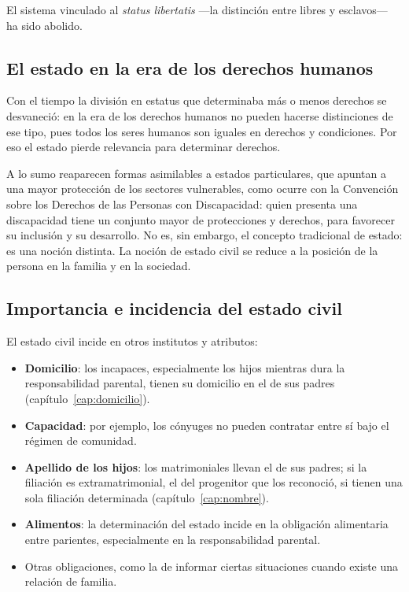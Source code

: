 \documentclass[12pt,oneside]{book}
\begin{document}
El sistema vinculado al \textit{status libertatis} ---la distinción entre libres y esclavos--- ha sido abolido.

\subsection{El estado en la era de los derechos humanos}

Con el tiempo la división en estatus que determinaba más o menos derechos se desvaneció: en la era de los derechos humanos no pueden hacerse distinciones de ese tipo, pues todos los seres humanos son iguales en derechos y condiciones. Por eso el estado pierde relevancia para determinar derechos.

\begin{importante}
A lo sumo reaparecen formas asimilables a estados particulares, que apuntan a una mayor protección de los sectores vulnerables, como ocurre con la Convención sobre los Derechos de las Personas con Discapacidad: quien presenta una discapacidad tiene un conjunto mayor de protecciones y derechos, para favorecer su inclusión y su desarrollo. No es, sin embargo, el concepto tradicional de estado: es una noción distinta. La noción de estado civil se reduce a la posición de la persona en la familia y en la sociedad.
\end{importante}

\subsection{Importancia e incidencia del estado civil}

El estado civil incide en otros institutos y atributos:

\begin{itemize}
\item \textbf{Domicilio}: los incapaces, especialmente los hijos mientras dura la responsabilidad parental, tienen su domicilio en el de sus padres (capítulo~\ref{cap:domicilio}).
\item \textbf{Capacidad}: por ejemplo, los cónyuges no pueden contratar entre sí bajo el régimen de comunidad.
\item \textbf{Apellido de los hijos}: los matrimoniales llevan el de sus padres; si la filiación es extramatrimonial, el del progenitor que los reconoció, si tienen una sola filiación determinada (capítulo~\ref{cap:nombre}).
\item \textbf{Alimentos}: la determinación del estado incide en la obligación alimentaria entre parientes, especialmente en la responsabilidad parental.
\item Otras obligaciones, como la de informar ciertas situaciones cuando existe una relación de familia.
\end{itemize}
\end{document}
